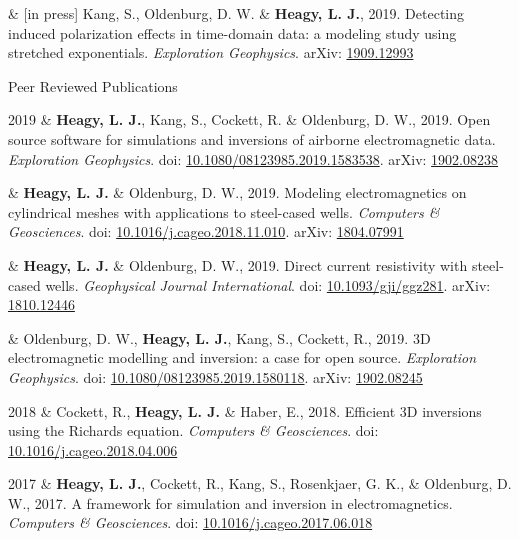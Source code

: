 \documentclass[a4paper, 11pt]{article}
\newcommand{\arxiv}[1]{arXiv: \href{https://arxiv.org/abs/#1}{#1}}
\newcommand{\doi}[1]{doi: \href{https://doi.org/#1}{#1}}
\newcommand{\subheading}[1]{
    \vspace{0.4cm}
    {\Large #1}\\
    \vspace{-0.2cm}
}
\begin{document}
\begin{entryright}
& [in press] Kang, S., Oldenburg, D. W. \& \textbf{Heagy, L. J.}, 2019. Detecting induced polarization effects in time-domain data: a modeling study using stretched exponentials. \emph{Exploration Geophysics}. \arxiv{1909.12993}
\end{entryright}


\subheading{Peer Reviewed Publications}

\begin{entryright}
2019 & \textbf{Heagy, L. J.}, Kang, S., Cockett, R. \& Oldenburg, D. W., 2019. Open source software for simulations and inversions of airborne electromagnetic data. \emph{Exploration Geophysics}. \doi{10.1080/08123985.2019.1583538}. \arxiv{1902.08238}
\end{entryright}

\begin{entryright}
& \textbf{Heagy, L. J.} \& Oldenburg, D. W., 2019. Modeling electromagnetics on cylindrical meshes with applications to steel-cased wells. \emph{Computers \& Geosciences}. \doi{10.1016/j.cageo.2018.11.010}. \arxiv{1804.07991}
\end{entryright}

\begin{entryright}
& \textbf{Heagy, L. J.} \& Oldenburg, D. W., 2019. Direct current resistivity with steel-cased wells. \emph{Geophysical Journal International}. \doi{10.1093/gji/ggz281}. \arxiv{1810.12446}
\end{entryright}

\begin{entryright}
& Oldenburg, D. W., \textbf{Heagy, L. J.}, Kang, S., Cockett, R., 2019. 3D electromagnetic modelling and inversion: a case for open source. \emph{Exploration Geophysics}. \doi{10.1080/08123985.2019.1580118}. \arxiv{1902.08245}
\end{entryright}

\begin{entryright}
2018 & Cockett, R., \textbf{Heagy, L. J.} \& Haber, E., 2018. Efficient 3D inversions using the Richards equation. \emph{Computers \& Geosciences}. \doi{10.1016/j.cageo.2018.04.006}
\end{entryright}

\begin{entryright}
2017 & \textbf{Heagy, L. J.}, Cockett, R., Kang, S., Rosenkjaer, G. K., \& Oldenburg, D. W., 2017. A framework for simulation and inversion in electromagnetics. \emph{Computers \& Geosciences}. \doi{10.1016/j.cageo.2017.06.018}
\end{entryright}
\end{document}

